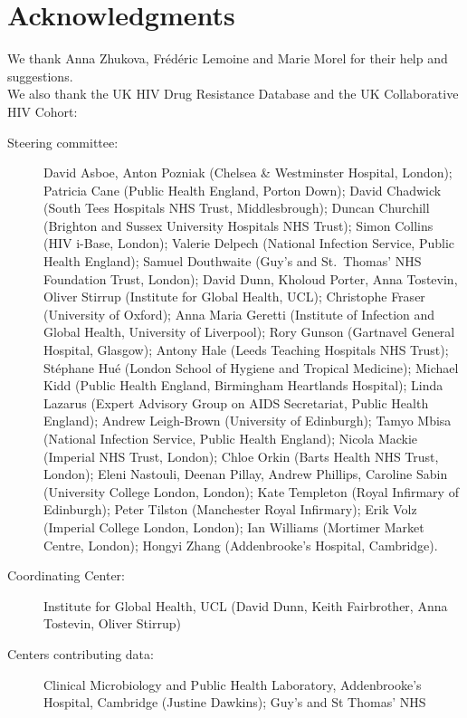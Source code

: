 \documentclass[
  11pt,
  twoside]{scrbook}
\begin{document}
\hypertarget{hiv-acknowledgments}{%
\section*{Acknowledgments}\label{hiv-acknowledgments}}

We thank Anna Zhukova, Frédéric Lemoine and Marie Morel for their help
and suggestions.\\
We also thank the UK HIV Drug Resistance Database and the UK
Collaborative HIV Cohort:\\

\begin{description}
\item[Steering committee:]
David Asboe, Anton Pozniak (Chelsea \& Westminster Hospital, London);
Patricia Cane (Public Health England, Porton Down); David Chadwick
(South Tees Hospitals NHS Trust, Middlesbrough); Duncan Churchill
(Brighton and Sussex University Hospitals NHS Trust); Simon Collins
(HIV i-Base, London); Valerie Delpech (National Infection Service,
Public Health England); Samuel Douthwaite (Guy's and St.~Thomas' NHS
Foundation Trust, London); David Dunn, Kholoud Porter, Anna
Tostevin, Oliver Stirrup (Institute for Global Health, UCL);
Christophe Fraser (University of Oxford); Anna Maria Geretti
(Institute of Infection and Global Health, University of Liverpool);
Rory Gunson (Gartnavel General Hospital, Glasgow); Antony Hale
(Leeds Teaching Hospitals NHS Trust); Stéphane Hué (London School of
Hygiene and Tropical Medicine); Michael Kidd (Public Health England,
Birmingham Heartlands Hospital); Linda Lazarus (Expert Advisory
Group on AIDS Secretariat, Public Health England); Andrew
Leigh-Brown (University of Edinburgh); Tamyo Mbisa (National
Infection Service, Public Health England); Nicola Mackie (Imperial
NHS Trust, London); Chloe Orkin (Barts Health NHS Trust, London);
Eleni Nastouli, Deenan Pillay, Andrew Phillips, Caroline Sabin
(University College London, London); Kate Templeton (Royal Infirmary
of Edinburgh); Peter Tilston (Manchester Royal Infirmary); Erik Volz
(Imperial College London, London); Ian Williams (Mortimer Market
Centre, London); Hongyi Zhang (Addenbrooke's Hospital, Cambridge).
\item[Coordinating Center:]
Institute for Global Health, UCL (David Dunn, Keith Fairbrother,
Anna Tostevin, Oliver Stirrup)
\item[Centers contributing data:]
Clinical Microbiology and Public Health Laboratory, Addenbrooke's
Hospital, Cambridge (Justine Dawkins); Guy's and St Thomas' NHS

\end{description}
\end{document}
